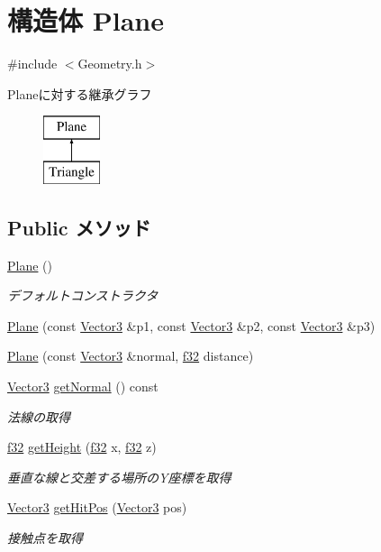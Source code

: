 \hypertarget{struct_plane}{\section{構造体 Plane}
\label{struct_plane}
}


{\ttfamily \#include $<$Geometry.\-h$>$}

Planeに対する継承グラフ\begin{figure}[H]
\begin{center}
\leavevmode
\includegraphics[height=2.000000cm]{d3/d0f/struct_plane}
\end{center}
\end{figure}
\subsection*{Public メソッド}
\begin{DoxyCompactItemize}
\item 
\hyperlink{struct_plane_acac0d9c003e0ab10d07b146c3566a0c7}{Plane} ()
\begin{DoxyCompactList}\small\item\em デフォルトコンストラクタ \end{DoxyCompactList}\item 
\hyperlink{struct_plane_a5fa258ae607328c90d1bbd0168ad9a20}{Plane} (const \hyperlink{struct_vector3}{Vector3} \&p1, const \hyperlink{struct_vector3}{Vector3} \&p2, const \hyperlink{struct_vector3}{Vector3} \&p3)
\item 
\hyperlink{struct_plane_a79b26a1d57d05317ca1f0533890b989e}{Plane} (const \hyperlink{struct_vector3}{Vector3} \&normal, \hyperlink{_main_8h_a5f6906312a689f27d70e9d086649d3fd}{f32} distance)
\item 
\hyperlink{struct_vector3}{Vector3} \hyperlink{struct_plane_a63fed40cafac842d07e82f2ee66ddd71}{get\-Normal} () const 
\begin{DoxyCompactList}\small\item\em 法線の取得 \end{DoxyCompactList}\item 
\hyperlink{_main_8h_a5f6906312a689f27d70e9d086649d3fd}{f32} \hyperlink{struct_plane_a5696a831ac40c0f139e2cd15f9a7f29f}{get\-Height} (\hyperlink{_main_8h_a5f6906312a689f27d70e9d086649d3fd}{f32} x, \hyperlink{_main_8h_a5f6906312a689f27d70e9d086649d3fd}{f32} z)
\begin{DoxyCompactList}\small\item\em 垂直な線と交差する場所の\-Y座標を取得 \end{DoxyCompactList}\item 
\hyperlink{struct_vector3}{Vector3} \hyperlink{struct_plane_aa6d3d7915a022f511974dca828e4d170}{get\-Hit\-Pos} (\hyperlink{struct_vector3}{Vector3} pos)
\begin{DoxyCompactList}\small\item\em 接触点を取得 \end{DoxyCompactList}\end{DoxyCompactItemize}
